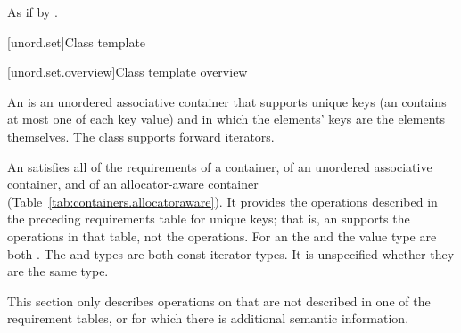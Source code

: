 \begin{itemdescr}
\pnum\effects As if by .
\end{itemdescr}

[unord.set]{Class template }%

[unord.set.overview]{Class template  overview}

\pnum
{}%
%
An  is an unordered associative container that
supports unique keys (an  contains at most one of each
key value) and in which the elements' keys are the elements
themselves.
The  class
supports forward iterators.

\pnum
An  satisfies all of the requirements of a container, of an unordered associative container, and of an allocator-aware container (Table~\ref{tab:containers.allocatoraware}). It provides the operations described in the preceding requirements table for unique keys; that is, an  supports the  operations in that table, not the  operations. For an  the  and the value type are both . The  and  types are both const iterator types. It is unspecified whether they are the same type.

\pnum
This section only describes operations on  that
are not described in one of the requirement tables, or for which there
is additional semantic information.

